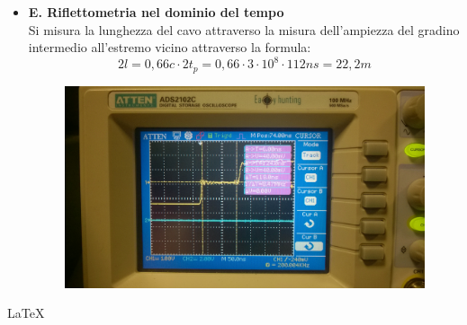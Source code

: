 \documentclass[a4paper]{article}
\begin{document}
\begin{itemize}
\item []\textbf{E. Riflettometria nel dominio del tempo} \\
  Si misura la lunghezza del cavo attraverso la misura dell’ampiezza del gradino intermedio all’estremo vicino attraverso la formula: 
\[2l=0,66c\cdot2t_p=0,66\cdot 3 \cdot 10^8 \cdot 112 ns = 22,2 m\]

\begin{figure}[H]
\centering
\includegraphics[scale=0.07]{foto/foto18.jpg}
\end{figure}

\end{itemize}

\LaTeX
\end{document}
